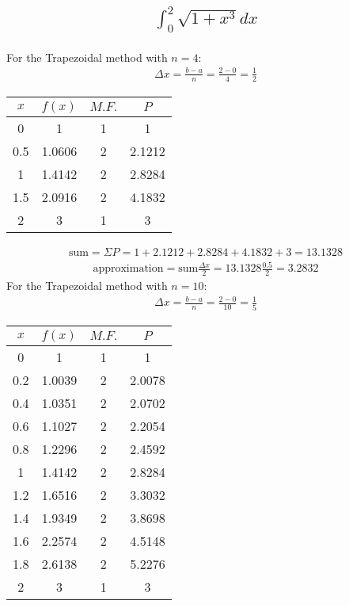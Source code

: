 \documentclass{article}
\begin{document}
\subsection{
	\begin{align*}
		\int_0^2{\sqrt{1 + x^3} dx}
	\end{align*}
}
For the Trapezoidal method with $n = 4$:
\begin{align*}
	\Delta x= \frac{b - a}{n} = \frac{2 - 0}{4} = \frac{1}{2}
\end{align*}
\begin{center}
	\begin{tabular}{|c|c|c|c|}
	\hline
	$x$ & 	$f(x)$ 		& $M.F.$ 	& $P$ 	\\ \hline
	0   		& 1    		& 1      	& 1 		\\ \hline
	0.5   		& 1.0606   	& 2      	& 2.1212 	\\ \hline
	1   		& 1.4142    	& 2      	& 2.8284 	\\ \hline
	1.5   		& 2.0916    	& 2      	& 4.1832 	\\ \hline
	2  		& 3    		& 1      	& 3 		\\ \hline
	\end{tabular}
\end{center}
\begin{align*}
	\text{sum} = \Sigma{P} = 1 + 2.1212 + 2.8284 + 4.1832 + 3 = 13.1328
\end{align*}
\begin{align*}
	\text{approximation} = \text{sum} \frac{\Delta x}{2} = 13.1328 \frac{0.5}{2} = 3.2832
\end{align*}
For the Trapezoidal method with $n = 10$:
\begin{align*}
	\Delta x= \frac{b - a}{n} = \frac{2 - 0}{10} = \frac{1}{5}
\end{align*}
\begin{center}
	\begin{tabular}{|c|c|c|c|}
	\hline
	$x$ & 	$f(x)$ 		& $M.F.$ 	& $P$ 	\\ \hline
	0   		& 1    		& 1      	& 1 		\\ \hline
	0.2   		& 1.0039	   	& 2      	& 2.0078	\\ \hline
	0.4   		& 1.0351	    	& 2      	& 2.0702	\\ \hline
	0.6   		& 1.1027	    	& 2      	& 2.2054	\\ \hline
	0.8  		& 1.2296  		& 2      	& 2.4592	\\ \hline
	1   		& 1.4142  		& 2      	& 2.8284	\\ \hline
	1.2   		& 1.6516	   	& 2      	& 3.3032	\\ \hline
	1.4   		& 1.9349	    	& 2      	& 3.8698	\\ \hline
	1.6   		& 2.2574	    	& 2      	& 4.5148	\\ \hline
	1.8  		& 2.6138  		& 2      	& 5.2276 	\\ \hline
	2		& 3			& 1		& 3		\\ \hline
	\end{tabular}
\end{center}
\end{document}
